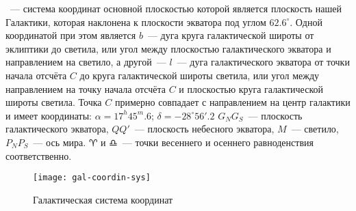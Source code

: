 ~--- система координат основной плоскостью которой является плоскость нашей Галактики, которая наклонена к плоскости экватора под углом $62.6^{\circ}$. Одной координатой при этом является  $b$~--- дуга круга галактической широты от эклиптики до светила, или угол между плоскостью галактического экватора и направлением на светило, а другой~---  $l$~--- дуга галактического экватора от точки начала отсчёта $C$ до круга галактической широты светила, или угол между направлением на точку начала отсчёта $C$ и плоскостью круга галактической широты светила. Точка $C$ примерно совпадает с направлением на центр галактики и имеет координаты: $\alpha=17^h45^m.6$; $\delta=-28^{\circ}56'.2$ $G_NG_S$~--- плоскость галактического экватора, $QQ'$~--- плоскость небесного экватора, $M$~--- светило, $P_NP_S$~--- ось мира. $\aries$ и $\libra$~--- точки весеннего и осеннего равноденствия соответственно.

\begin{figure}[!h]
\begin{center}
\texttt{[image: gal-coordin-sys]}
\caption{Галактическая система координат}
\end{center}
\end{figure}